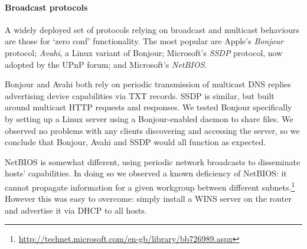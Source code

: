 
\paragraph{Broadcast protocols} A widely deployed set of protocols relying on
broadcast and multicast behaviours are those for `zero conf' functionality.  The
most popular are Apple's \emph{Bonjour} protocol; \emph{Avahi}, a Linux variant
of Bonjour; Microsoft's \emph{SSDP} protocol, now adopted by the UPnP forum; and
Microsoft's \emph{NetBIOS}.  

Bonjour and Avahi both rely on periodic transmission of multicast DNS replies
advertising device capabilities via TXT records.  SSDP is similar, but built
around multicast HTTP requests and responses.  We tested Bonjour specifically by
setting up a Linux server using a Bonjour-enabled daemon to share files.  We
observed no problems with any clients discovering and accessing the server, so
we conclude that Bonjour, Avahi and SSDP would all function as expected. 

NetBIOS is somewhat different, using periodic network broadcasts to disseminate
hosts' capabilities.  In doing so we observed a known deficiency of NetBIOS: it
cannot propagate information for a given workgroup between different
subnets.\footnote{\url{http://technet.microsoft.com/en-gb/library/bb726989.aspx}}
However this was easy to overcome: simply install a WINS server on the router
and advertise it via DHCP to all hosts.


